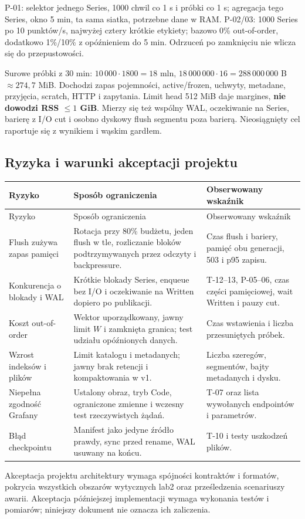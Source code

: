 \documentclass[11pt,a4paper]{article}
\newcommand{\tabhead}[1]{\toprule #1\\ \midrule\endfirsthead
  \toprule #1\\ \midrule\endhead \bottomrule\endfoot}
\begin{document}
P-01: selektor jednego Series, 1000 chwil co 1 s i próbki co 1 s;
agregacja tego Series, okno 5 min, ta sama siatka, potrzebne dane w RAM.
P-02/03: 1000 Series po 10 punktów/s, najwyżej cztery krótkie etykiety;
bazowo 0\% out-of-order, dodatkowo 1\%/10\% z opóźnieniem do 5 min.
Odrzuceń po zamknięciu nie wlicza się do przepustowości.

Surowe próbki z 30 min: $10\,000\cdot1800=18$ mln,
$18\,000\,000\cdot16=288\,000\,000$ B $\approx274{,}7$ MiB.
Dochodzi zapas pojemności, active/frozen, uchwyty, metadane, przyjęcia,
scratch, HTTP i zapytania. Limit head 512 MiB daje margines,
\textbf{nie dowodzi RSS $\leq1$ GiB}. Mierzy się też wspólny WAL,
oczekiwanie na Series, barierę z I/O cut i osobno dyskowy flush segmentu poza barierą.
Nieosiągnięty cel raportuje się z wynikiem i wąskim gardłem.

\subsection{Ryzyka i warunki akceptacji projektu}
\begin{longtable}{P{37mm}P{61mm}P{58mm}}
\tabhead{Ryzyko & Sposób ograniczenia & Obserwowany wskaźnik}
Flush zużywa zapas pamięci & Rotacja przy 80\% budżetu, jeden flush
w tle, rozliczanie bloków podtrzymywanych przez odczyty i backpressure. &
Czas flush i bariery, pamięć obu generacji, 503 i p95 zapisu.\\
Konkurencja o blokady i WAL & Krótkie blokady Series, enqueue bez I/O
i oczekiwanie na Written dopiero po publikacji. &
T-12--13, P-05--06, czas części pamięciowej, wait Written i pauzy cut.\\
Koszt out-of-order & Wektor uporządkowany, jawny limit $W$ i zamknięta
granica; test udziału opóźnionych danych. &
Czas wstawienia i liczba przesuniętych próbek.\\
Wzrost indeksów i plików & Limit katalogu i metadanych; jawny brak
retencji i kompaktowania w v1. &
Liczba szeregów, segmentów, bajty metadanych i dysku.\\
Niepełna zgodność Grafany & Ustalony obraz, tryb Code, ograniczone
zmienne i wczesny test rzeczywistych żądań. &
T-07 oraz lista wywołanych endpointów i parametrów.\\
Błąd checkpointu & Manifest jako jedyne źródło prawdy, sync przed rename,
WAL usuwany na końcu. &
T-10 i testy uszkodzeń plików.\\
\end{longtable}

Akceptacja projektu architektury wymaga spójności kontraktów i formatów,
pokrycia wszystkich obszarów wytycznych lab2 oraz prześledzenia scenariuszy
awarii. Akceptacja późniejszej implementacji wymaga wykonania testów
i pomiarów; niniejszy dokument nie oznacza ich zaliczenia.
\end{document}
